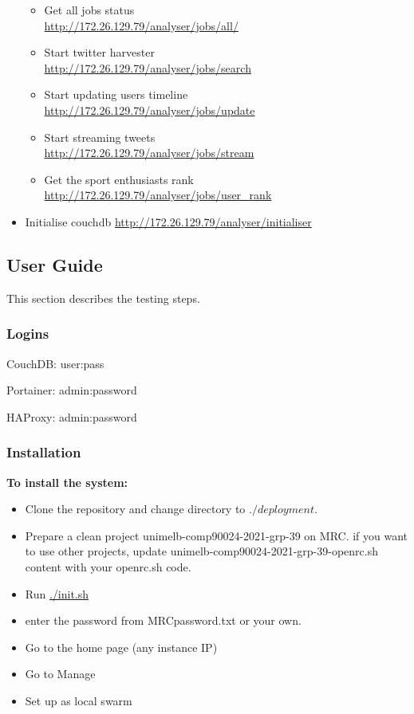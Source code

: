 \begin{itemize}
\begin{itemize}
        \item Get all jobs status\\
        \url{http://172.26.129.79/analyser/jobs/all/}
        \item Start twitter harvester\\
        \url{http://172.26.129.79/analyser/jobs/search}
        \item Start updating users timeline\\
        \url{http://172.26.129.79/analyser/jobs/update}
        \item Start streaming tweets\\
        \url{http://172.26.129.79/analyser/jobs/stream}
        \item Get the sport enthusiasts rank\\
        \url{http://172.26.129.79/analyser/jobs/user_rank}
    \end{itemize}
    \item Initialise couchdb
    \url{http://172.26.129.79/analyser/initialiser}
\end{itemize}

\subsection{User Guide}

This section describes the testing steps. 

\subsubsection{Logins}

CouchDB: user:pass

Portainer: admin:password

HAProxy: admin:password

\subsubsection{Installation}

\textbf{To install the system: }

\begin{itemize}
    \item Clone the repository and change directory to $./deployment$.
    \item Prepare a clean project unimelb-comp90024-2021-grp-39 on MRC. if you want to use other projects, update unimelb-comp90024-2021-grp-39-openrc.sh content with your openrc.sh code. 
    \item Run \href{https://bitbucket.org/comp90024team39/comp90024-a2/src/master/deployment/init.sh}{./init.sh}
    \item enter the password from MRCpassword.txt or your own. 
    \item Go to the home page (any instance IP)
    \item Go to Manage
    \item Set up as local swarm
\end{itemize}

